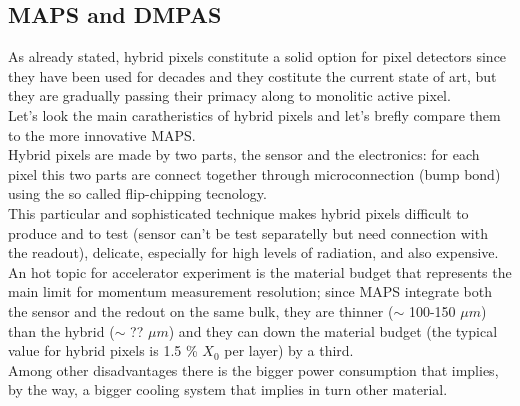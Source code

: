 \begin{titlepage}
\subsection{MAPS and DMPAS}
As already stated, hybrid pixels constitute a solid option for pixel detectors since they have been used for decades and they costitute the current state of art, but they are gradually passing their primacy along to monolitic active pixel.\\
Let's look the main caratheristics of hybrid pixels and let's brefly compare them to the more innovative MAPS. \\ 

Hybrid pixels are made by two parts, the sensor and the electronics: for each pixel this two parts are connect together through microconnection (bump bond) using the so called flip-chipping tecnology.\\
This particular and sophisticated technique makes hybrid pixels difficult to produce and to test (sensor can't be test separatelly but need connection with the readout), delicate, especially for high levels of radiation, and also expensive. \\
An hot topic for accelerator experiment is the material budget that represents the main limit for momentum measurement resolution; since MAPS integrate both the sensor and the redout on the same bulk, they are thinner ($\sim$ 100-150 $\mu m$) than the hybrid ($\sim$ ?? $\mu m$) and they can down the material budget (the typical value for hybrid pixels is 1.5 \% $X_0$ per layer) by a third.\\
Among other disadvantages there is the bigger power consumption that implies, by the way, a bigger cooling system that implies in turn other material.\\


\end{titlepage}
